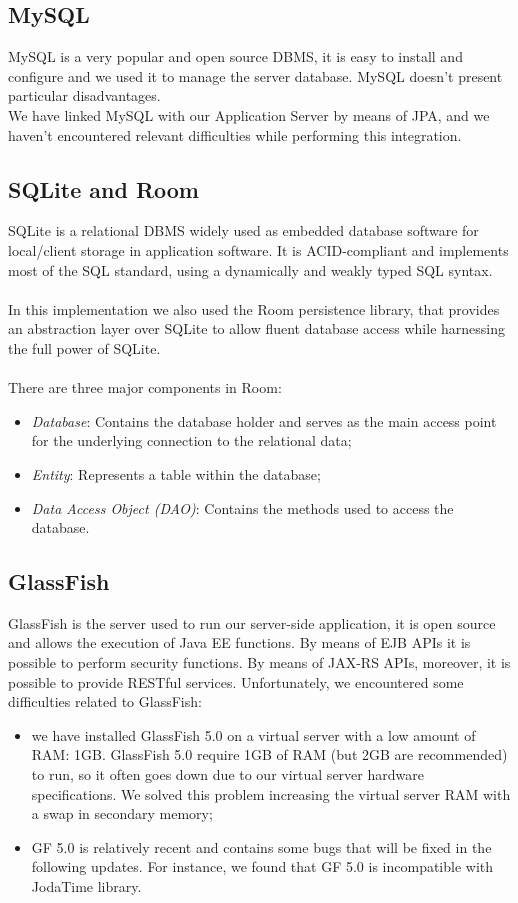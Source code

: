 \subsection{MySQL}
\label{subsec:Middleware}
MySQL is a very popular and open source DBMS, it is easy to install and configure and we used it to manage the server database. MySQL doesn't present particular disadvantages.\\
We have linked MySQL with our Application Server by means of JPA, and we haven't encountered relevant difficulties while performing this integration.

\subsection{SQLite and Room}
\label{subsec:SQLite and Room}
SQLite is a relational DBMS widely used as embedded database software for local/client storage in application software. It is ACID-compliant and implements most of the SQL standard, using a dynamically and weakly typed SQL syntax. \\\\
In this implementation we also used the Room persistence library, that provides an abstraction layer over SQLite to allow fluent database access while harnessing the full power of SQLite. \\\\
There are three major components in Room:
\begin{itemize}
\item \textit{Database}: Contains the database holder and serves as the main access point for the underlying connection to the relational data;
\item \textit{Entity}: Represents a table within the database;
\item \textit{Data Access Object (DAO)}: Contains the methods used to access the database.
\end{itemize}

\subsection{GlassFish}
\label{subsec:GlassFish}
GlassFish is the server used to run our server-side application, it is open source and allows the execution of Java EE functions. By means of EJB APIs it is possible to perform security functions. 
By means of JAX-RS APIs, moreover, it is possible to provide RESTful services. 
Unfortunately, we encountered some difficulties related to GlassFish:
\begin{itemize}
\item we have installed GlassFish 5.0 on a virtual server with a low amount of RAM: 1GB. GlassFish 5.0 require 1GB of RAM (but 2GB are recommended) to run, so it often goes down due to our virtual server hardware specifications. We solved this problem increasing the virtual server RAM with a swap in secondary memory;
\item GF 5.0 is relatively recent and contains some bugs that will be fixed in the following updates. For instance, we found that GF 5.0 is incompatible with JodaTime library.
\end{itemize}
